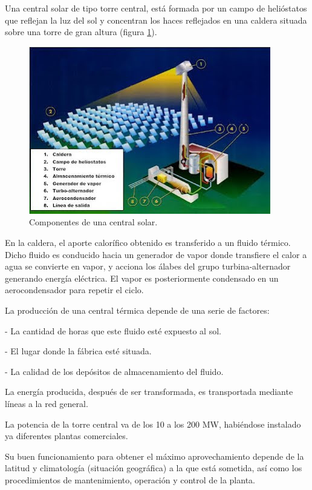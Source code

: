 Una central solar de tipo torre central, está formada por un campo de helióstatos que reflejan la luz del sol y concentran los haces reflejados en una caldera situada sobre una torre de gran altura (figura \ref{fig:FotosPaginasWebHeliostatos/unnamed(2).jpg}).

\begin{figure}[h!]
  	\centering
	\includegraphics[scale=1]{FotosPaginasWebHeliostatos/unnamed(2).jpg}
	\caption{Componentes de una central solar.
	\label{fig:FotosPaginasWebHeliostatos/unnamed(2).jpg}}
\end{figure}

En la caldera, el aporte calorífico obtenido es transferido a un fluido térmico. Dicho fluido es conducido hacia un generador de vapor donde transfiere el calor a agua se convierte en vapor, y acciona los álabes del grupo turbina-alternador generando energía eléctrica. El vapor es posteriormente condensado en un aerocondensador para repetir el ciclo.

La producción de una central térmica depende de una serie de factores:

- La cantidad de horas que este fluido esté expuesto al sol.

- El lugar donde la fábrica esté situada.

- La calidad de los depósitos de almacenamiento del fluido.

La energía producida, después de ser transformada, es transportada mediante líneas a la red general. \cite{LuciaRinconWebSite}

La potencia de la torre central va de los 10 a los 200 MW, habiéndose instalado ya diferentes plantas comerciales.

Su buen funcionamiento para obtener el máximo aprovechamiento depende de la latitud y climatología (situación geográfica) a la que está sometida, así como los procedimientos de mantenimiento, operación y control de la planta.

